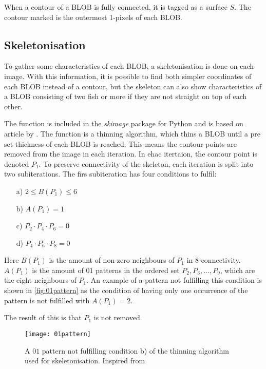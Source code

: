 When a contour of a BLOB is fully connected, it is tagged as a surface $ S $. The contour marked is the outermost 1-pixels of each BLOB.

\subsection{Skeletonisation}
To gather some characteristics of each BLOB, a skeletonisation is done on each image. With this information, it is possible to find both simpler coordinates of each BLOB instead of a contour, but the skeleton can also show characteristics of a BLOB consisting of two fish or more if they are not straight on top of each other.

The function is included in the \textit{skimage} package for Python and is based on article by \cite{Zhang1984}. The function is a thinning algorithm, which thins a BLOB until a pre set thickness of each BLOB is reached. This means the contour points are removed from the image in each iteration. In ehac itertaion, the contour point is denoted $P_1$. 
To preserve connectivity of the skeleton, each iteration is split into two subiterations. The firs subiteration has four conditions to fulfil:

\begin{itemize}
	\item[a)] $ 2 \leq B(P_1) \leq 6 $
	\item[b)] $ A(P_1) = 1 $
	\item[c)] $ P_2 \cdot P_4 \cdot P_6 = 0 $
	\item[d)] $ P_4 \cdot P_6 \cdot P_8 = 0 $
\end{itemize}

Here $B(P_1)$ is the amount of non-zero neighbours of $P_1$ in 8-connectivity. $ A(P_1) $ is the amount of $01$ patterns in the ordered set $P_2, P_3, ... , P_9$, which are the eight neighbours of $P_1$. An example of a pattern not fulfilling this condition is shown in \autoref{fig:01pattern} as the condition of having only one occurrence of the pattern is not fulfilled with $A(P_1) = 2$.

The result of this is that $P_1$ is not removed.

\begin{figure}[H]
	\centering
	\texttt{[image: 01pattern]}
	\caption{A $01$ pattern not fulfilling condition b) of the thinning algorithm used for skeletonisation. Inspired from \cite{Zhang1984}}
	\label{fig:01pattern}
\end{figure}

